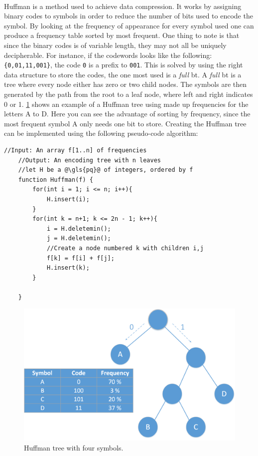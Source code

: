 \documentclass[a4paper, 12pt]{report}
\newcommand{\codeword}[1]{\texttt{#1}}
\begin{document}
\paragraph{}
Huffman is a method used to achieve data compression\cite{huffman}.
It works by assigning binary codes to symbols in order to reduce the number of bits used to encode the symbol.
By looking at the frequency of appearance for every symbol used one can produce a frequency table sorted by most frequent.
One thing to note is that since the binary codes is of variable length, they may not all be uniquely decipherable.
For instance, if the codewords looks like the following: \codeword{\{0,01,11,001\}}, the code \codeword{0} is a prefix to \codeword{001}.
This is solved by using the right data structure to store the codes, the one most used is a \textit{full} \gls{bt}.
A \textit{full} \gls{bt} is a tree where every node either has zero or two child nodes.
The symbols are then generated by the path from the root to a leaf node, where left and right indicates 0 or 1.
\ref{fig:hm-ex} shows an example of a Huffman tree using made up frequencies for the letters A to D.
Here you can see the advantage of sorting by frequency, since the most frequent symbol A only needs one bit to store.
Creating the Huffman tree can be implemented using the following pseudo-code algorithm:

\begin{lstlisting}[caption=Huffman algorithm \cite{algorithms}, label=lst:huffman]
	//Input: An array f[1..n] of frequencies
	//Output: An encoding tree with n leaves
	//let H be a @\gls{pq}@ of integers, ordered by f
	function Huffman(f) {
		for(int i = 1; i <= n; i++){
			H.insert(i);
		}
		for(int k = n+1; k <= 2n - 1; k++){
			i = H.deletemin();
			j = H.deletemin();
			//Create a node numbered k with children i,j
			f[k] = f[i] + f[j];
			H.insert(k);
		}

	}
\end{lstlisting}

\begin{figure}[h!]
	\centering
		\includegraphics[width=1.0\textwidth]{images/huffman.png}
		\caption{Huffman tree with four symbols.}
		\label{fig:hm-ex}
\end{figure}
\end{document}
